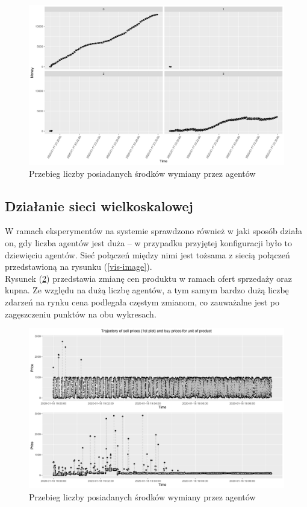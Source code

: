 \documentclass{article}
\begin{document}
\begin{figure}[H]
	\centering
	\includegraphics[width=\textwidth]{./png/monopoly-money.png}
	\caption{Przebieg liczby posiadanych środków wymiany przez agentów}
	\label{monopoly-money}
\end{figure}

\subsection{Działanie sieci wielkoskalowej \label{big-net}}

W ramach eksperymentów na systemie sprawdzono również w jaki sposób działa on, gdy liczba agentów jest duża -- w przypadku przyjętej konfiguracji było to dziewięciu agentów.
Sieć połączeń między nimi jest tożsama z siecią połączeń przedstawioną na rysunku (\ref{vis-image}).\\
Rysunek (\ref{big-net-money}) przedstawia zmianę cen produktu w ramach ofert sprzedaży oraz kupna. Ze względu na dużą liczbę agentów, a tym samym bardzo dużą liczbę zdarzeń na rynku cena podlegała częstym zmianom, co zauważalne 
jest po zagęszczeniu punktów na obu wykresach.

\begin{figure}[H]
	\centering
	\includegraphics[width=\textwidth]{./png/big-net-money.png}
	\caption{Przebieg liczby posiadanych środków wymiany przez agentów}
	\label{big-net-money}
\end{figure}
\end{document}

